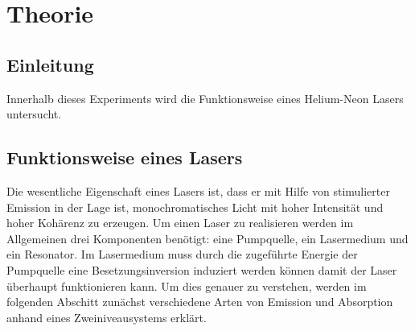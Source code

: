 \section{Theorie}
\label{sec:Theorie}

\subsection{Einleitung}

Innerhalb dieses Experiments wird die Funktionsweise eines Helium-Neon Lasers untersucht.


\subsection{Funktionsweise eines Lasers}

Die wesentliche Eigenschaft eines Lasers ist, dass er mit Hilfe von stimulierter
Emission in der Lage ist, monochromatisches Licht mit hoher Intensität und
hoher Kohärenz zu erzeugen.
Um einen Laser zu realisieren werden im Allgemeinen drei Komponenten benötigt:
eine Pumpquelle, ein Lasermedium und ein Resonator. Im Lasermedium muss durch die zugeführte
Energie der Pumpquelle eine Besetzungsinversion induziert werden können
damit der Laser überhaupt funktionieren kann. Um dies genauer zu verstehen,
werden im folgenden Abschitt zunächst verschiedene Arten von Emission und Absorption
anhand eines Zweiniveausystems erklärt.

